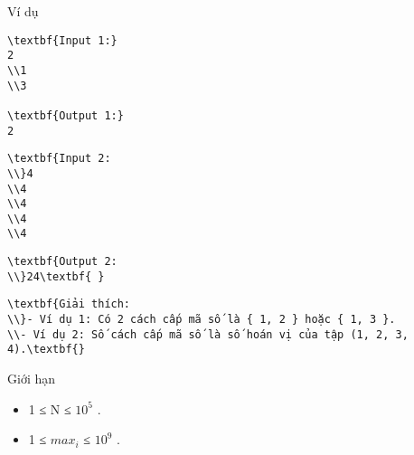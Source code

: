 Ví dụ  
\begin{verbatim}
\textbf{Input 1:}
2
\\1
\\3

\textbf{Output 1:}
2\end{verbatim}
\begin{verbatim}
\textbf{Input 2:
\\}4
\\4
\\4
\\4
\\4 \end{verbatim}
\begin{verbatim}
\textbf{Output 2:
\\}24\textbf{ }\end{verbatim}
\begin{verbatim}
\textbf{Giải thích:
\\}- Ví dụ 1: Có 2 cách cấp mã số là { 1, 2 } hoặc { 1, 3 }.
\\- Ví dụ 2: Số cách cấp mã số là số hoán vị của tập (1, 2, 3, 4).\textbf{}\end{verbatim}
   Giới hạn  
\begin{itemize}
	\item     1 ≤ N ≤ $10^{5}$    .   
	\item     1 ≤ $max_{i}$    ≤ $10^{9}$    .   
\end{itemize}
